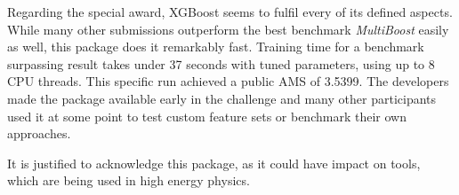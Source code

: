 Regarding the special award, XGBoost seems to fulfil every of its defined aspects. While many other submissions outperform the best benchmark \emph{MultiBoost} easily as well, this package does it remarkably fast. Training time for a benchmark surpassing result takes under 37 seconds with tuned parameters, using up to 8 CPU threads. This specific run achieved a public AMS of 3.5399.
The developers made the package available early in the challenge and many other participants used it at some point to test custom feature sets or benchmark their own approaches.

It is justified to acknowledge this package, as it could have impact on tools, which are being used in high energy physics\cite{HEPml}.